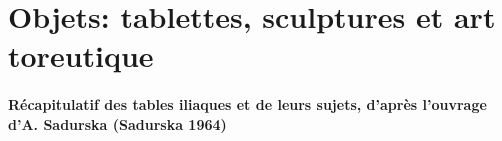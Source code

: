 \documentclass[14pt]{these}
\begin{document}
\part[Objets: tablettes, sculptures et art\\toreutique]{Objets: tablettes, sculptures et art toreutique}
\newcommand{\objet}[2][]{
  {
    \setkeys{bdd}{#1}
    \centering\noindent\texttt{[image: \#2]}

    \vfill
    \textbf{Dénomination:} \BDDname\\ 
    \textbf{Sujet:} \BDDsubject\\ 
    \textbf{Matériau:} \BDDmaterial\\
    \textbf{Datation:} \BDDdate\\ 
    \textbf{Artiste:} \BDDartist\\ 
    \textbf{Lieu de découverte:} \BDDdiscovery\\ 
    \textbf{Localisation actuelle:} \BDDlocation\\ 
    \textbf{Crédits photographiques:} \BDDcredits

    \vspace{2\onelineskip}
  }

  \clearpage
}


\subsection*{Récapitulatif des tables iliaques et de leurs sujets, d'après l'ouvrage
d'A. Sadurska (Sadurska 1964)}
\end{document}
